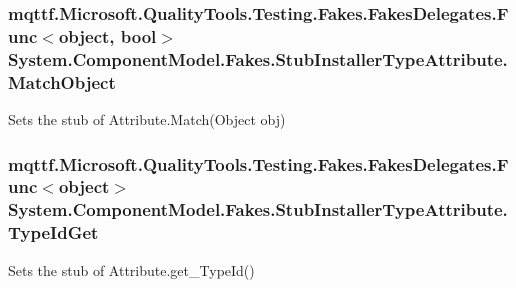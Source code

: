 \hypertarget{class_system_1_1_component_model_1_1_fakes_1_1_stub_installer_type_attribute_abc2e5bd3f33ebd308bb4bedfaa05b1f3}{
\subsubsection[{Match\-Object}]{\setlength{\rightskip}{0pt plus 5cm}mqttf.\-Microsoft.\-Quality\-Tools.\-Testing.\-Fakes.\-Fakes\-Delegates.\-Func$<$object, bool$>$ System.\-Component\-Model.\-Fakes.\-Stub\-Installer\-Type\-Attribute.\-Match\-Object}}\label{class_system_1_1_component_model_1_1_fakes_1_1_stub_installer_type_attribute_abc2e5bd3f33ebd308bb4bedfaa05b1f3}


Sets the stub of Attribute.\-Match(\-Object obj)

\hypertarget{class_system_1_1_component_model_1_1_fakes_1_1_stub_installer_type_attribute_a9a1fc9e2b84a1d90b4fecaea4a705b20}{
\subsubsection[{Type\-Id\-Get}]{\setlength{\rightskip}{0pt plus 5cm}mqttf.\-Microsoft.\-Quality\-Tools.\-Testing.\-Fakes.\-Fakes\-Delegates.\-Func$<$object$>$ System.\-Component\-Model.\-Fakes.\-Stub\-Installer\-Type\-Attribute.\-Type\-Id\-Get}}\label{class_system_1_1_component_model_1_1_fakes_1_1_stub_installer_type_attribute_a9a1fc9e2b84a1d90b4fecaea4a705b20}


Sets the stub of Attribute.\-get\-\_\-\-Type\-Id()



